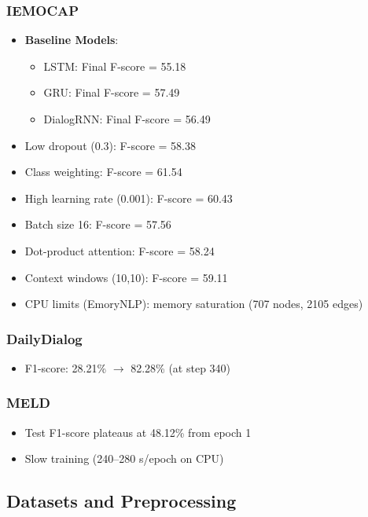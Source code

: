 \documentclass[a4paper,11pt]{article}
\begin{document}
\subsubsection{IEMOCAP}
\begin{itemize}
  \item \textbf{Baseline Models}:
    \begin{itemize}
      \item LSTM: Final F-score = 55.18  
      \item GRU: Final F-score = 57.49  
      \item DialogRNN: Final F-score = 56.49  
    \end{itemize}
  \item Low dropout (0.3): F-score = 58.38  
  \item Class weighting: F-score = 61.54  
  \item High learning rate (0.001): F-score = 60.43  
  \item Batch size 16: F-score = 57.56  
  \item Dot-product attention: F-score = 58.24  
  \item Context windows (10,10): F-score = 59.11  
  \item CPU limits (EmoryNLP): memory saturation (707 nodes, 2105 edges)
\end{itemize}

\subsubsection{DailyDialog}
\begin{itemize}
  \item F1-score: 28.21\% $\rightarrow$ 82.28\% (at step 340)
\end{itemize}

\subsubsection{MELD}
\begin{itemize}
  \item Test F1-score plateaus at 48.12\% from epoch 1  
  \item Slow training (240–280 s/epoch on CPU)
\end{itemize}

\subsection{Datasets and Preprocessing}
\end{document}
